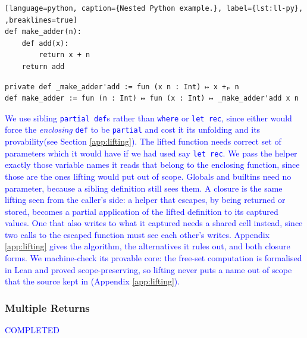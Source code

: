 \documentclass{article}
\newcommand{\code}{\lstinline}
\newcommand{\suggest}[1]{\textcolor{blue}{#1}}
\begin{document}
\noindent
\begin{minipage}[t]{0.48\textwidth}
\begin{lstlisting}[language=python, caption={Nested Python example.}, label={lst:ll-py},  ,breaklines=true]
def make_adder(n): 
    def add(x): 
        return x + n 
    return add
\end{lstlisting}
\end{minipage}%
\hfill
\begin{minipage}[t]{0.48\textwidth}
\begin{lstlisting}[language=lean, caption={Lambda Lifted converted Lean code}, label={lst:ll-lean}, breaklines=true, mathescape=true]
private def _make_adder'add := fun (x n : Int) ↦ x +ₚ n
def make_adder := fun (n : Int) ↦ fun (x : Int) ↦ _make_adder'add x n
\end{lstlisting}
\end{minipage}



\suggest{We use sibling \code{partial def}s rather than \code{where} or \code{let rec}, since either would force the \emph{enclosing} \code{def} to be \code{partial} and cost it its unfolding and its provability(see Section \ref{app:lifting}). The lifted function needs correct set of parameters which it would have if we had used say \code{let rec}. We pass the helper exactly those variable names it reads that belong to the enclosing function, since those are the ones lifting would put out of scope. Globals and builtins need no parameter, because a sibling definition still sees them. A closure is the same lifting seen from the caller's side: a helper that escapes, by being returned or stored, becomes a partial application of the lifted definition to its captured values. One that also writes to what it captured needs a shared cell instead, since two calls to the escaped function must see each other's writes. Appendix \ref{app:lifting} gives the algorithm, the alternatives it rules out, and both closure forms. We machine-check its provable core: the free-set computation is formalised in Lean and proved scope-preserving, so lifting never puts a name out of scope that the source kept in (Appendix \ref{app:lifting}).}

\subsubsection{Multiple Returns}
\suggest{COMPLETED}
\end{document}
